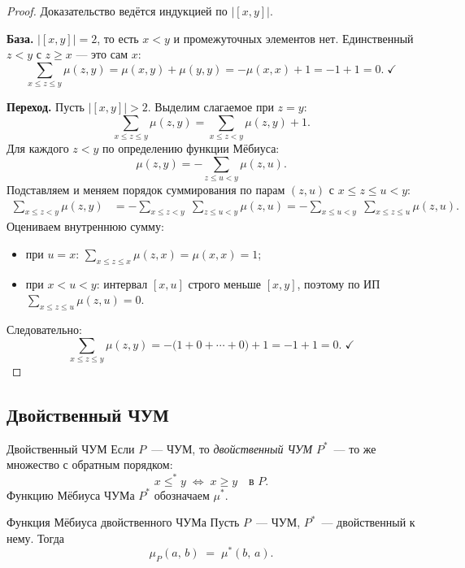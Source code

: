 \begin{proof}
	Доказательство ведётся индукцией по $|[x,y]|$.
	
	\textbf{База.} $|[x,y]| = 2$, то есть $x < y$ и промежуточных элементов нет.
	Единственный $z < y$ с $z \geq x$ --- это сам $x$:
	\[
	\sum_{x \leq z \leq y}\mu(z,y)
	= \mu(x,y) + \mu(y,y)
	= -\mu(x,x) + 1
	= -1 + 1 = 0.\;\checkmark
	\]
	
	\textbf{Переход.} Пусть $|[x,y]| > 2$. Выделим слагаемое при $z=y$:
	\[
	\sum_{x \leq z \leq y}\mu(z,y)
	= \sum_{x \leq z < y}\mu(z,y) + 1.
	\]
	Для каждого $z < y$ по определению функции Мёбиуса:
	\[
	\mu(z,y) = -\sum_{z \leq u < y}\mu(z,u).
	\]
	Подставляем и меняем порядок суммирования по парам $(z,u)$ с $x \leq z \leq u < y$:
	\begin{align*}
		\sum_{x \leq z < y}\mu(z,y)
		&= -\sum_{x \leq z < y}\;\sum_{z \leq u < y}\mu(z,u)
		= -\sum_{x \leq u < y}\;\sum_{x \leq z \leq u}\mu(z,u).
	\end{align*}
	Оцениваем внутреннюю сумму:
	\begin{itemize}
		\item при $u = x$: $\displaystyle\sum_{x \leq z \leq x}\mu(z,x) = \mu(x,x) = 1$;
		\item при $x < u < y$: интервал $[x,u]$ строго меньше $[x,y]$,
		поэтому по ИП $\displaystyle\sum_{x \leq z \leq u}\mu(z,u) = 0$.
	\end{itemize}
	Следовательно:
	\[
	\sum_{x \leq z \leq y}\mu(z,y)
	= -\bigl(1 + 0 + \cdots + 0\bigr) + 1
	= -1 + 1 = 0.\;\checkmark
	\]
\end{proof}

\subsection{Двойственный ЧУМ}

\begin{Definition}{Двойственный ЧУМ}{}
	Если $P$~--- ЧУМ, то \emph{двойственный ЧУМ} $P^*$~--- то же множество с обратным порядком:
	\[
	x \leq^* y \;\Longleftrightarrow\; x \geq y \quad\text{в } P.
	\]
	Функцию Мёбиуса ЧУМа $P^*$ обозначаем $\mu^*$.
\end{Definition}

\begin{Theorem}{Функция Мёбиуса двойственного ЧУМа}{}
	Пусть $P$~--- ЧУМ, $P^*$~--- двойственный к нему. Тогда
	\[
	\mu_P(a,\, b) \;=\; \mu^*(b,\, a).
	\]
\end{Theorem}

